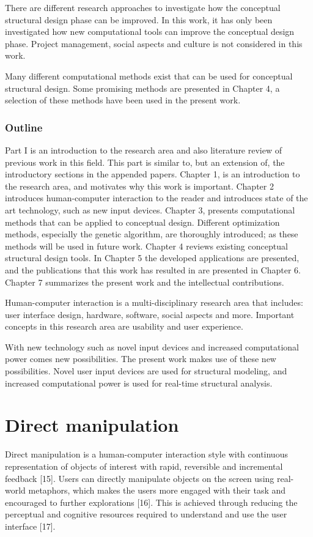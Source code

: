 There are different research approaches to investigate how the conceptual structural design phase can be improved. In this work, it has only been investigated how new computational tools can improve the conceptual design phase. Project management, social aspects and culture is not considered in this work.

Many different computational methods exist that can be used for conceptual structural design. Some promising methods are presented in Chapter 4, a selection of these methods have been used in the present work.

\subsubsection{Outline}
Part I is an introduction to the research area and also literature review of previous work in this field. This part is similar to, but an extension of, the introductory sections in the appended papers. Chapter 1, is an introduction to the research area, and motivates why this work is important. Chapter 2 introduces human-computer interaction to the reader and introduces state of the art technology, such as new input devices. Chapter 3, presents computational methods that can be applied to conceptual design. Different optimization methods, especially the genetic algorithm, are thoroughly introduced; as these methods will be used in future work. Chapter 4 reviews existing conceptual structural design tools. In Chapter 5 the developed applications are presented, and the publications that this work has resulted in are presented in Chapter 6. Chapter 7 summarizes the present work and the intellectual contributions.






Human-computer interaction is a multi-disciplinary research area that includes: user interface design, hardware, software, social aspects and more. Important concepts in this research area are usability and user experience.

With new technology such as novel input devices and increased computational power comes new possibilities. The present work makes use of these new possibilities. Novel user input devices are used for structural modeling, and increased computational power is used for real-time structural analysis. 

\section{Direct manipulation}
Direct manipulation is a human-computer interaction style with continuous representation of objects of interest with rapid, reversible and incremental feedback [15]. Users can directly manipulate objects on the screen using real-world metaphors, which makes the users more engaged with their task and encouraged to further explorations [16]. This is achieved through reducing the perceptual and cognitive resources required to understand and use the user interface [17].

